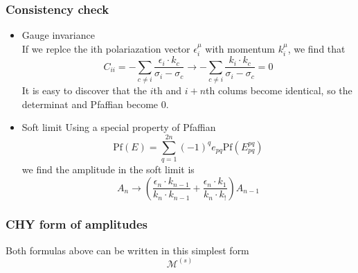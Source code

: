 \documentclass{beamer}
\begin{document}
\begin{frame}
    \frametitle{Consistency check}
    \begin{itemize}
        \item \alert{Gauge invariance}\\
        If we replce the ith polariazation vector $\epsilon_i^\mu$ with momentum $k_i^\mu$, we find that
        \begin{equation*}
            C_{ii}=-\sum_{c\neq i}\frac{\epsilon_i\cdot k_c}{\sigma_i-\sigma_c} \to -\sum_{c\neq i}\frac{k_i\cdot k_c}{\sigma_i-\sigma_c}=0
        \end{equation*}
        It is easy to discover that the $i$th and $i+n$th colums become identical, so the determinat and Pfaffian become 0.
        \pause
        \item \alert{Soft limit}
        Using a special property of Pfaffian
        \begin{equation*}
            \mathrm{Pf} (E)=\sum_{q=1}^{2n}(-1)^q e_{pq}\mathrm{Pf}(E^{pq}_{pq})
        \end{equation*}
        we find the amplitude in the soft limit is 
        \begin{equation*}
            A_n\to\left(\frac{\epsilon_n\cdot k_{n-1}}{k_n\cdot k_{n-1}}+\frac{\epsilon_n\cdot k_1}{k_n\cdot k_!}\right)A_{n-1}
        \end{equation*}
    \end{itemize}
\end{frame}
\begin{frame}
    \frametitle{CHY form of amplitudes}
    Both formulas above can be written in this simplest form 
    \begin{equation*}
        \mathcal{M}^{(s)}
    \end{equation*}
\end{frame}
\end{document}
